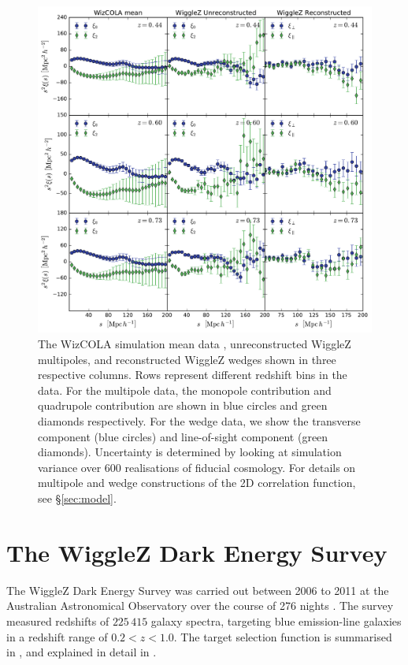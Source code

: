 \documentclass[a4paper,fleqn,usenatbib]{mnras}
\begin{document}
\begin{figure}
	\begin{center}
		\includegraphics[width=\textwidth]{dataplot.pdf}
	\end{center}
	\caption{The WizCOLA simulation mean data \citep{KazinKoda2014,KodaBlake2015}, unreconstructed WiggleZ multipoles, and reconstructed WiggleZ wedges shown in three respective columns. Rows represent different redshift bins in the data. For the multipole data, the monopole contribution and quadrupole contribution are shown in blue circles and green diamonds respectively. For the wedge data, we show the transverse component (blue circles) and line-of-sight component (green diamonds). Uncertainty is determined by looking at simulation variance over 600 realisations of fiducial cosmology. For details on multipole and wedge constructions of the 2D correlation function, see \S\ref{sec:model}.}
	\label{fig:wizcola}
\end{figure}


\section{The WiggleZ Dark Energy Survey}\label{sect:wigglez}

The WiggleZ Dark Energy Survey was carried out between 2006 to 2011 at the Australian Astronomical Observatory over the course of 276 nights \citep{Drinkwater2010}. The survey measured redshifts of $225\,415$ galaxy spectra, targeting blue emission-line galaxies in a redshift range of $0.2 < z < 1.0$. The target selection function is summarised in \citet{BlakeDavis2011}, and explained in detail in \citet{BlakeBrough2010}. 
\end{document}
